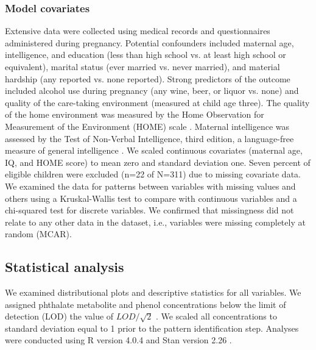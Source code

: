 \subsubsection{Model covariates}
\label{sec:cov}
Extensive data were collected using medical records and questionnaires administered during pregnancy. Potential confounders included maternal age, intelligence, and education (less than high school vs. at least high school or equivalent), marital status (ever married vs. never married), and material hardship (any reported vs. none reported). Strong predictors of the outcome included alcohol use during pregnancy (any wine, beer, or liquor vs. none) and quality of the care-taking environment (measured at child age three). The quality of the home environment was measured by the Home Observation for Measurement of the Environment (HOME) scale \citep{caldwellhome}. Maternal intelligence was assessed by the Test of Non-Verbal Intelligence, third edition, a language-free measure of general intelligence \citep{brown1990test}. We scaled continuous covariates (maternal age, IQ, and HOME score) to mean zero and standard deviation one. Seven percent of eligible children were excluded (n=22 of N=311) due to missing covariate data. We examined the data for patterns between variables with missing values and others using a Kruskal-Wallis test to compare with continuous variables and a chi-squared test for discrete variables. We confirmed that missingness did not relate to any other data in the dataset, i.e., variables were missing completely at random (MCAR).

\subsection{Statistical analysis}
We examined distributional plots and descriptive statistics for all variables. We assigned phthalate metabolite and phenol concentrations below the limit of detection (LOD) the value of $LOD/\sqrt{2}$ \citep{hornung1990estimation}. We scaled all concentrations to standard deviation equal to 1 prior to the pattern identification step. Analyses were conducted using R version 4.0.4 and Stan version 2.26 \citep{rrr, gelman2015stan}. 

